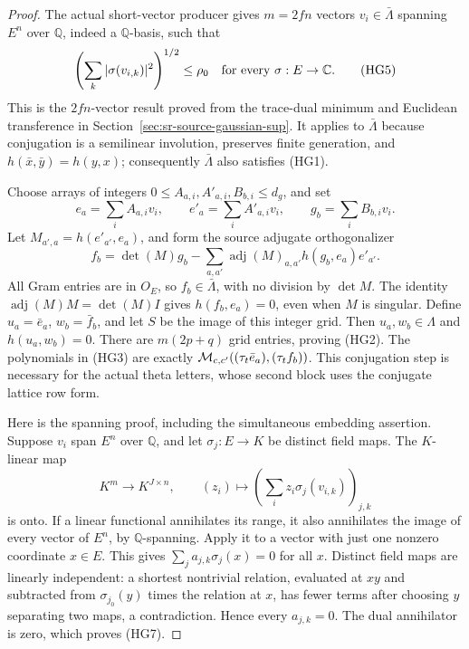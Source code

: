 \begin{proof}
The actual short-vector producer gives \(m=2fn\) vectors
\(v_i\in\bar\Lambda\) spanning \(E^n\) over \(\mathbb Q\),
indeed a \(\mathbb Q\)-basis, such that
\[
 \left(\sum_k|\sigma(v_{i,k})|^2\right)^{1/2}
          \le\rho_0\quad\hbox{for every }\sigma:E\to\mathbb C.
 \tag{HG5}\label{eq:sr-source-short-vector-basis-use}
\]
This is the \(2fn\)-vector result proved from the trace-dual
minimum and Euclidean transference in
Section~\ref{sec:sr-source-gaussian-sup}.
It applies to \(\bar\Lambda\) because conjugation is a
semilinear involution, preserves finite generation, and
\(h(\bar x,\bar y)=h(y,x)\); consequently
\(\bar\Lambda\) also satisfies (HG1).

Choose arrays of integers
\(0\le A_{a,i},A'_{a,i},B_{b,i}\le d_g\), and set
\[
 e_a=\sum_iA_{a,i}v_i,\qquad
 e'_a=\sum_iA'_{a,i}v_i,\qquad
 g_b=\sum_iB_{b,i}v_i .
\]
Let \(M_{a',a}=h(e'_{a'},e_a)\), and form the source
adjugate orthogonalizer
\[
 f_b=\det(M)g_b-
       \sum_{a,a'}\operatorname{adj}(M)_{a,a'}
                              h(g_b,e_a)e'_{a'}.
 \tag{HG6}\label{eq:sr-source-adjugate-orthogonalizer}
\]
All Gram entries are in \(O_E\), so \(f_b\in\bar\Lambda\),
with no division by \(\det M\).
The identity \(\operatorname{adj}(M)M=\det(M)I\) gives
\(h(f_b,e_a)=0\), even when \(M\) is singular.
Define \(u_a=\bar e_a\), \(w_b=\bar f_b\), and let \(S\)
be the image of this integer grid.
Then \(u_a,w_b\in\Lambda\) and \(h(u_a,w_b)=0\).
There are \(m(2p+q)\) grid entries, proving (HG2).
The polynomials in (HG3) are exactly
\({\cal M}_{c,c'}((\tau_t\bar e_a),(\tau_tf_b))\).
This conjugation step is necessary for the actual theta
letters, whose second block uses the conjugate lattice
row form.

Here is the spanning proof, including the simultaneous
embedding assertion.  Suppose \(v_i\) span \(E^n\) over
\(\mathbb Q\), and let \(\sigma_j:E\to K\) be distinct
field maps.  The \(K\)-linear map
\[
 K^m\longrightarrow K^{J\times n},\qquad
 (z_i)\longmapsto
       \left(\sum_i z_i\sigma_j(v_{i,k})\right)_{j,k}
 \tag{HG7}\label{eq:sr-source-embedding-surjection}
\]
is onto.
If a linear functional annihilates its range, it also
annihilates the image of every vector of \(E^n\), by
\(\mathbb Q\)-spanning.
Apply it to a vector with just one nonzero coordinate
\(x\in E\).  This gives
\(\sum_j a_{j,k}\sigma_j(x)=0\) for all \(x\).
Distinct field maps are linearly independent:
a shortest nontrivial relation, evaluated at \(xy\)
and subtracted from \(\sigma_{j_0}(y)\) times the
relation at \(x\), has fewer terms after choosing
\(y\) separating two maps, a contradiction.
Hence every \(a_{j,k}=0\).  The dual annihilator is
zero, which proves (HG7).


\end{proof}
